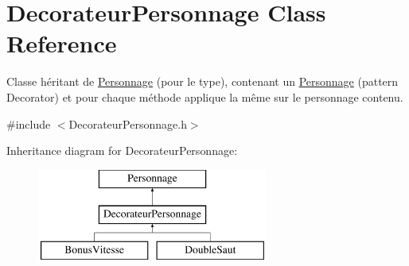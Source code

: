 \hypertarget{classDecorateurPersonnage}{\section{Decorateur\-Personnage Class Reference}
\label{classDecorateurPersonnage}
}


Classe héritant de \hyperlink{classPersonnage}{Personnage} (pour le type), contenant un \hyperlink{classPersonnage}{Personnage} (pattern Decorator) et pour chaque méthode applique la même sur le personnage contenu.  




{\ttfamily \#include $<$Decorateur\-Personnage.\-h$>$}

Inheritance diagram for Decorateur\-Personnage\-:\begin{figure}[H]
\begin{center}
\leavevmode
\includegraphics[height=3.000000cm]{classDecorateurPersonnage}
\end{center}
\end{figure}
